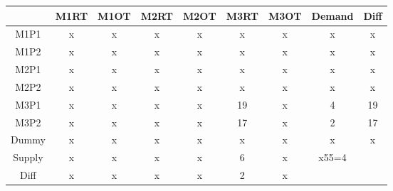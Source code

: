 \documentclass{article}%
\begin{document}
\begin{tabular}{c|cccc|c|ccc}
    & M1RT & M1OT & M2RT & M2OT & M3RT & M3OT & Demand               & Diff                 \\
    \midrule
    M1P1   & x    & x    & x    & x    & x    & x    & x                    & x                    \\
    M1P2   & x    & x    & x    & x    & x    & x    & x                    & x                    \\
    M2P1   & x    & x    & x    & x    & x    & x    & x                    & x                    \\
    M2P2   & x    & x    & x    & x    & x    & x    & x                    & x                    \\
    \cmidrule{2-9}
    M3P1   & x    & x    & x    & x    & 19   & x    & 4                    & 19                   \\
    \cmidrule{2-9}
    M3P2   & x    & x    & x    & x    & 17   & x    & 2                    & 17                   \\
    Dummy  & x    & x    & x    & x    & x    & x    & x                    & x                    \\
    Supply & x    & x    & x    & x    & 6    & x    & x55=4                &                      \\
    Diff   & x    & x    & x    & x    & 2    & x    &                      &                      \\
\end{tabular}
\newline
\newline
\end{document}
